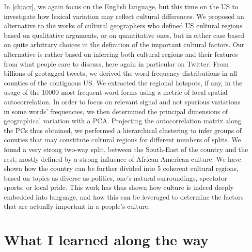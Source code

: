 \documentclass[../thesis.tex]{subfiles}
\begin{document}
In \cref{ch:acr}, we again focus on the English language, but this time on the US to
investigate how lexical variation may reflect cultural differences. We proposed an
alternative to the works of cultural geographers who defined US cultural regions based
on qualitative arguments, or on quantitative ones, but in either case based on quite
arbitrary choices in the definition of the important cultural factors. Our alternative
is rather based on inferring both cultural regions and their features from what people
care to discuss, here again in particular on Twitter. From billions of geotagged tweets,
we derived the word frequency distributions in all counties of the contiguous US. We
extracted the regional hotspots, if any, in the usage of the \SI{10000}{} most frequent
word forms using a metric of local spatial autocorrelation. In order to focus on
relevant signal and not spurious variations in some words' frequencies, we then
determined the principal dimensions of geographical variation with a \ac{PCA}.
Projecting the autocorrelation matrix along the \acp{PC} thus obtained, we performed a
hierarchical clustering to infer groups of counties that may constitute cultural regions
for different numbers of splits. We found a very strong two-way split, between the
South-East of the country and the rest, mostly defined by a strong influence of
African-American culture. We have shown how the country can be further divided into 5
coherent cultural regions, based on topics as diverse as politics, one's natural
surroundings, spectator sports, or local pride. This work has thus shown how culture is
indeed deeply embedded into language, and how this can be leveraged to determine the
factors that are actually important in a people's culture.


\section{What I learned along the way}
\end{document}
